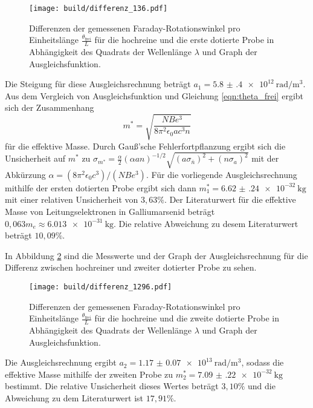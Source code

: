 \begin{figure}[H]
  \centering
  \texttt{[image: build/differenz\_136.pdf]}
  \caption{Differenzen der gemessenen Faraday-Rotationswinkel pro Einheitslänge $\frac{\theta_\text{frei}}{L}$ für die hochreine und die erste dotierte Probe in Abhängigkeit des Quadrats der Wellenlänge $\lambda$ und Graph der Ausgleichsfunktion.}
  \label{fig:differenz136}
\end{figure}

Die Steigung für diese Ausgleichsrechnung beträgt $a_1 = \SI{5.8(4)e12}{\radian\per\cubic\meter}$. Aus dem Vergleich von Ausgleichsfunktion und Gleichung \eqref{eqn:theta_frei} ergibt sich der Zusammenhang
\begin{equation}
  m^{*} = \sqrt{\frac{NBe^3}{8\pi^2 \epsilon_0 a c^3 n}}
\end{equation}
für die effektive Masse. Durch Gauß'sche Fehlerfortpflanzung ergibt sich die Unsicherheit auf $m^{*}$ zu $\sigma_{m^{*}} = \frac{\alpha}{2} (\alpha a n)^{-1/2} \sqrt{(a \sigma_{\bar{n}})^2+(n \sigma_a)^2}$ mit der Abkürzung $\alpha = (8\pi^2 \epsilon_0 c^3)/(N B e^3)$.
Für die vorliegende Ausgleichsrechnung mithilfe der ersten dotierten Probe ergibt sich dann $m^{*}_1 = \SI{6.62(24)e-32}{\kilo\gram}$ mit einer relativen Unsicherheit von $3{,}63\%$.
Der Literaturwert für die effektive Masse von Leitungselektronen in Galliumarsenid beträgt $0{,}063 m_e \approx \SI{6.013e-31}{\kilo\gram}$\cite{effm}. Die relative Abweichung zu desem Literaturwert beträgt $10{,}09\%$.

In Abbildung \ref{fig:differenz1296} sind die Messwerte und der Graph der Ausgleichsrechnung für die Differenz zwischen hochreiner und zweiter dotierter Probe zu sehen.

\begin{figure}[H]
  \centering
  \texttt{[image: build/differenz\_1296.pdf]}
  \caption{Differenzen der gemessenen Faraday-Rotationswinkel pro Einheitslänge $\frac{\theta_\text{frei}}{L}$ für die hochreine und die zweite dotierte Probe in Abhängigkeit des Quadrats der Wellenlänge $\lambda$ und Graph der Ausgleichsfunktion.}
  \label{fig:differenz1296}
\end{figure}

Die Ausgleichsrechnung ergibt $a_2 = \SI{1.17(7)e13}{\radian\per\cubic\meter}$, sodass die effektive Masse mithilfe der zweiten Probe zu $m^{*}_2 = \SI{7.09(22)e-32}{\kilo\gram}$ bestimmt. Die relative Unsicherheit dieses Wertes beträgt $3{,}10\%$ und die Abweichung zu dem Literaturwert ist $17{,}91\%$.
